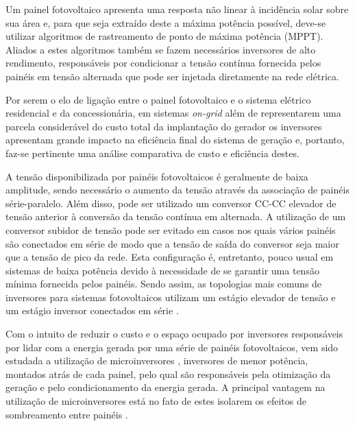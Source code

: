 \documentclass[
	12pt,				%
	openany,
	onseside,
	a4paper,			%
	english,			%
	french,				%
	spanish,			%
	brazil,				%
	]{abntex2}
\begin{document}
	Um painel fotovoltaico apresenta uma resposta não linear à incidência solar sobre sua área e, para que seja extraído deste 
	a máxima potência possível, deve-se utilizar algoritmos de rastreamento de ponto de máxima potência (MPPT). Aliados a 
	estes algoritmos também se fazem necessários inversores de alto rendimento, responsáveis por condicionar a tensão 
	contínua fornecida pelos painéis em tensão alternada que pode ser injetada diretamente na rede elétrica.
	
 
	Por serem o elo de ligação entre o painel fotovoltaico e o sistema elétrico residencial e da concessionária, em sistemas \textit{on-grid} além de representarem uma parcela considerável do custo total da implantação do gerador os inversores apresentam grande impacto na eficiência final do sistema de geração e, portanto, faz-se pertinente uma análise comparativa de custo e eficiência destes.


	A tensão disponibilizada por painéis fotovoltaicos é geralmente de baixa amplitude, sendo necessário o aumento da tensão através da associação de painéis série-paralelo. Além disso, pode ser utilizado um conversor CC-CC elevador de tensão anterior à conversão da tensão contínua em alternada. A utilização de um conversor subidor de tensão pode ser evitado em casos nos quais vários painéis são conectados em série de modo que a tensão de saída do conversor seja maior que a tensão de pico da rede. Esta configuração  é, entretanto, pouco usual em sistemas de baixa potência devido à necessidade de se garantir uma tensão mínima fornecida pelos painéis. Sendo assim, as topologias mais comuns de inversores para sistemas fotovoltaicos utilizam um estágio elevador de tensão e um estágio inversor conectados em série \cite{LUIGIJUNIOR_ev_int}.

	Com o intuito de reduzir o custo e o espaço ocupado por inversores responsáveis por lidar com a energia gerada por uma série de painéis fotovoltaicos, vem sido estudada a utilização de microinversores \cite{Bouzguenda_smart_grid_inv}, inversores de menor potência, montados atrás de cada painel, pelo qual são responsáveis pela otimização da geração e pelo condicionamento da energia gerada. A principal vantagem na utilização de microinversores está no fato de estes isolarem os efeitos de sombreamento entre painéis \cite{Nezamuddin_des_eff_micro}.
\end{document}
